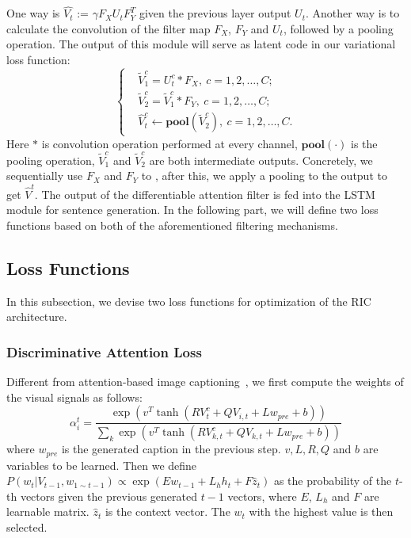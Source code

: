 \documentclass[10pt,twocolumn,letterpaper]{article}
\begin{document}
	One way is $\hat{V_t}$ := $\gamma F_X U_t F_Y^T$ given the previous layer output $U_t$. Another way is to calculate the convolution of the filter map $F_X$, $F_Y$ and $U_t$, followed by a pooling operation. The output of this module will serve as latent code in our variational loss function:
	\begin{equation}
	\left\{
	\begin{aligned}
	&{{\tilde V}_{1}^c} = {U^c_t}*{F_X},~c=1,2,\ldots,C;\\
	&{{\tilde V}_{2}^c} = {{\tilde V}_{1}^c}*{F_Y},~c=1,2,\ldots,C;\\
	&{\hat{V}_{t}^c}\leftarrow \mathbf{pool}({{\tilde V}^c_{2}}),~c=1,2,\ldots,C.
	\end{aligned}
	\right.
	\end{equation}
	Here $*$ is convolution operation performed at every channel, $\mathbf{pool}(\cdot)$ is the pooling operation, ${{\tilde V}_{1}^c}$ and ${{\tilde V}_{2}^c}$ are both intermediate outputs. Concretely, we sequentially use $F_X$ and $F_Y$ to , after this, we apply a pooling to the output to get $\hat{V}^t$.
	The output of the differentiable attention filter is fed into the LSTM module for sentence generation. In the following part, we will define two loss functions based on both of the aforementioned filtering mechanisms.
	
	
	
	
	
	
	
	
	\subsection{Loss Functions}\label{sec:loss}
	In this subsection, we devise two loss functions for optimization of the RIC architecture.
	
	\subsubsection{Discriminative Attention Loss}
	Different from attention-based image captioning~\cite{xu2015show}, we first compute the weights of the visual signals as follows:
	\begin{equation}
	\alpha _i^t = \frac{{\exp ({v^T}\tanh (RV_t^c + Q{V_{i,t}} + L{w_{pre}} + b))}}{{\sum\nolimits_{k} {\exp ({v^T}\tanh (RV_{k,t}^c + Q{V_{k,t}} + L{w_{pre}} + b))} }}
	\end{equation}
	where $w_{pre}$ is the generated caption in the previous step. %
	$v, L, R, Q$ and $b$ are variables to be learned. Then we define $P({{w_t}} |V_{t-1},{w_{1\sim t - 1}}) \propto \exp (E{w_{t - 1}} + {L_h}{h_t} + F{\hat z_t})$ as the probability of the $t$-th vectors given the previous generated $t-1$ vectors, where $E$, $L_h$ and $F$ are learnable matrix. ${\hat z_t}$ is the context vector. The $w_t$ with the highest value is then selected.
	
\end{document}
